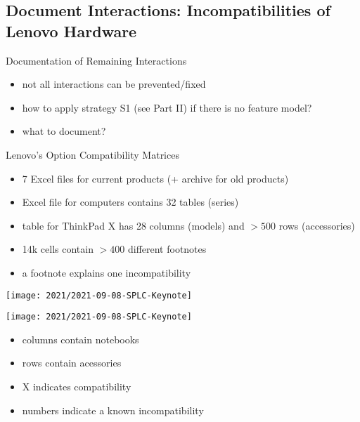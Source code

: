 \subsection{Document Interactions: Incompatibilities of Lenovo Hardware}
\begin{frame}{\myframetitle}
	\begin{mycolumns}[widths={55}]
		\begin{note}{Documentation of Remaining Interactions}
			\begin{itemize}
				\item not all interactions can be prevented/fixed
				\item how to apply strategy S1 (see Part II) if there is no feature model?
				\item what to document?
			\end{itemize}
		\end{note}
		\begin{example}{Lenovo's Option Compatibility Matrices}
			\begin{itemize}
				\item 7 Excel files for current products (+ archive for old products)
				\item Excel file for computers contains 32 tables (series)
				\item table for ThinkPad X has 28 columns (models) and $>500$ rows (accessories)
				\item 14k cells contain $>400$ different footnotes
				\item a footnote explains one incompatibility
			\end{itemize}
		\end{example}
	\mynextcolumn
		\texttt{[image: 2021/2021-09-08-SPLC-Keynote]}
	\end{mycolumns}
\end{frame}
\begin{frame}{\myframetitle}
	\begin{mycolumns}[widths={80},animation=none]
		\texttt{[image: 2021/2021-09-08-SPLC-Keynote]}
	\mynextcolumn
		\begin{example}{}\setlength\leftmargini{3mm} 
			\begin{itemize}
				\item columns contain notebooks
				\item rows contain acessories
				\item X indicates compatibility
				\item numbers indicate a known incompatibility
			\end{itemize}
		\end{example}
	\end{mycolumns}
\end{frame}
